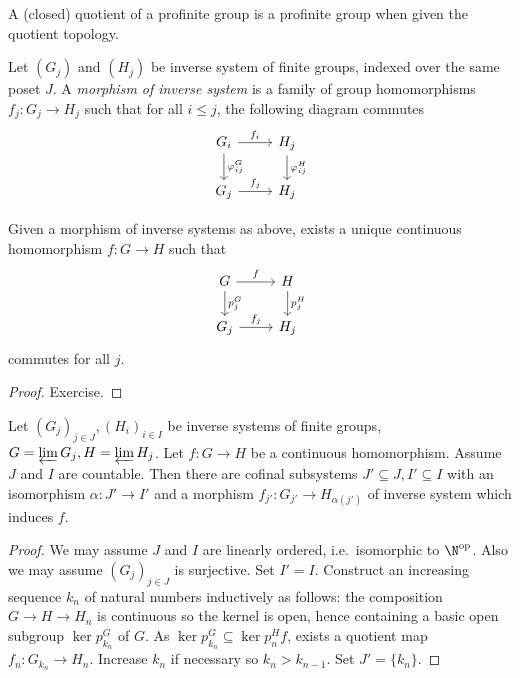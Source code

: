\documentclass[a4paper]{article}
\begin{document}
\begin{corollary}
  A (closed) quotient of a profinite group is a profinite group when given the quotient topology.
\end{corollary}

\begin{definition}
  Let \((G_j)\) and \((H_j)\) be inverse system of finite groups, indexed over the same poset \(J\). A \emph{morphism of inverse system} is a family of group homomorphisms \(f_j: G_j \to H_j\) such that for all \(i \leq j\), the following diagram commutes
  \[
    \begin{tikzcd}
      G_i \ar[r, "f_i"] \ar[d, "\varphi_{ij}^G"] & H_j \ar[d, "\varphi_{ij}^H"] \\
      G_j \ar[r, "f_j"] & H_j
    \end{tikzcd}
  \]
\end{definition}

\begin{proposition}
  Given a morphism of inverse systems as above, exists a unique continuous homomorphism \(f: G \to H\) such that
  \[
    \begin{tikzcd}
      G \ar[r, "f"] \ar[d, "p_j^G"] & H \ar[d, "p_j^H"] \\
      G_j \ar[r, "f_j"] & H_j
    \end{tikzcd}
  \]
  commutes for all \(j\).
\end{proposition}

\begin{proof}
  Exercise.
\end{proof}

\begin{proposition}
  Let \((G_j)_{j \in J}, (H_i)_{i \in I}\) be inverse systems of finite groups, \(G = \varprojlim G_j, H = \varprojlim H_j\). Let \(f: G \to H\) be a continuous homomorphism. Assume \(J\) and \(I\) are countable. Then there are cofinal subsystems \(J' \subseteq J, I' \subseteq I\) with an isomorphism \(\alpha: J' \to I'\) and a morphism \(f_{j'}: G_{j'} \to H_{\alpha(j')}\) of inverse system which induces \(f\).
\end{proposition}

\begin{proof}
  We may assume \(J\) and \(I\) are linearly ordered, i.e.\ isomorphic to \(\N^{\text{op}}\). Also we may assume \((G_j)_{j \in J}\) is surjective. Set \(I' = I\). Construct an increasing sequence \(k_n\) of natural numbers inductively as follows: the composition \(G \to H \to H_n\) is continuous so the kernel is open, hence containing a basic open subgroup \(\ker p_{k_n}^G\) of \(G\). As \(\ker p_{k_n}^G \subseteq \ker p_n^H f\), exists a quotient map \(f_n: G_{k_n} \to H_n\). Increase \(k_n\) if necessary so \(k_n > k_{n - 1}\). Set \(J' = \{k_n\}\).
\end{proof}
\end{document}
